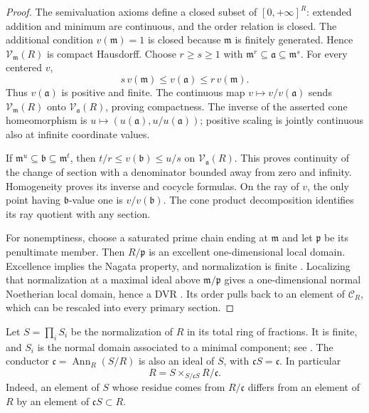 \begin{proof}
The semivaluation axioms define a closed subset of
$[0,+\infty]^R$: extended addition and minimum are continuous,
and the order relation is closed. The additional condition
$v(\mathfrak m)=1$ is closed because $\mathfrak m$ is finitely
generated. Hence $\mathcal V_{\mathfrak m}(R)$ is compact Hausdorff.
Choose $r\geq s\geq1$ with
$\mathfrak m^r\subseteq\mathfrak a\subseteq\mathfrak m^s$.
For every centered $v$,
\[
                  s\,v(\mathfrak m)\leq v(\mathfrak a)
                                     \leq r\,v(\mathfrak m).
\tag{70.7b}\label{eq:p121-primary-gauge-bounds}
\]
Thus $v(\mathfrak a)$ is positive and finite. The continuous map
$v\mapsto v/v(\mathfrak a)$ sends
$\mathcal V_{\mathfrak m}(R)$ onto $\mathcal V_{\mathfrak a}(R)$,
proving compactness. The inverse of the asserted cone homeomorphism
is $u\mapsto(u(\mathfrak a),u/u(\mathfrak a))$; positive scaling
is jointly continuous also at infinite coordinate values.

If $\mathfrak m^u\subseteq\mathfrak b\subseteq\mathfrak m^t$,
then $t/r\leq v(\mathfrak b)\leq u/s$ on
$\mathcal V_{\mathfrak a}(R)$. This proves continuity of the change
of section with a denominator bounded away from zero and infinity.
Homogeneity proves its inverse and cocycle formulas. On the ray of $v$,
the only point having $\mathfrak b$-value one is $v/v(\mathfrak b)$.
The cone product decomposition identifies its ray quotient with any section.

For nonemptiness, choose a saturated prime chain ending at $\mathfrak m$
and let $\mathfrak p$ be its penultimate member. Then $R/\mathfrak p$
is an excellent one-dimensional local domain. Excellence implies the
Nagata property, and normalization is finite
\cite[Tags 07QV and 035S]{StacksProject}. Localizing that normalization
at a maximal ideal above $\mathfrak m/\mathfrak p$ gives a
one-dimensional normal Noetherian local domain, hence a DVR
\cite[Tag 00PD]{StacksProject}. Its order pulls back to an element of
$\mathcal C_R$, which can be rescaled into every primary section.
\end{proof}

Let $S=\prod_iS_i$ be the normalization of $R$ in its total ring of
fractions. It is finite, and $S_i$ is the normal domain associated to a
minimal component; see \cite[Tags 035P and 035S]{StacksProject}.
The conductor $\mathfrak c=\operatorname{Ann}_R(S/R)$ is also an
ideal of $S$, with $\mathfrak cS=\mathfrak c$. In particular
\[
                    R=S\mathbin{\times}_{S/\mathfrak cS}R/\mathfrak c.
\tag{70.7c}\label{eq:p121-conductor-pullback-square}
\]
Indeed, an element of $S$ whose residue comes from $R/\mathfrak c$
differs from an element of $R$ by an element of $\mathfrak cS\subset R$.

